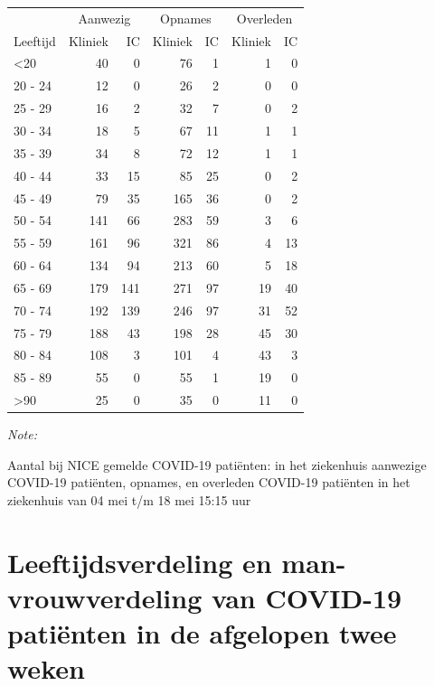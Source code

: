 \documentclass[
  english,
  man,floatsintext]{apa6}
\begin{document}
\begin{table}
\centering\begingroup\fontsize{10}{12}\selectfont

\begin{threeparttable}
\begin{tabular}{lrrrrrr}
\toprule
\multicolumn{1}{c}{ } & \multicolumn{2}{c}{Aanwezig} & \multicolumn{2}{c}{Opnames} & \multicolumn{2}{c}{Overleden} \\
\cmidrule(l{3pt}r{3pt}){2-3} \cmidrule(l{3pt}r{3pt}){4-5} \cmidrule(l{3pt}r{3pt}){6-7}
Leeftijd & Kliniek & IC & Kliniek & IC & Kliniek & IC\\
\midrule
<20 & 40 & 0 & 76 & 1 & 1 & 0\\
20 - 24 & 12 & 0 & 26 & 2 & 0 & 0\\
25 - 29 & 16 & 2 & 32 & 7 & 0 & 2\\
30 - 34 & 18 & 5 & 67 & 11 & 1 & 1\\
35 - 39 & 34 & 8 & 72 & 12 & 1 & 1\\
40 - 44 & 33 & 15 & 85 & 25 & 0 & 2\\
45 - 49 & 79 & 35 & 165 & 36 & 0 & 2\\
50 - 54 & 141 & 66 & 283 & 59 & 3 & 6\\
55 - 59 & 161 & 96 & 321 & 86 & 4 & 13\\
60 - 64 & 134 & 94 & 213 & 60 & 5 & 18\\
65 - 69 & 179 & 141 & 271 & 97 & 19 & 40\\
70 - 74 & 192 & 139 & 246 & 97 & 31 & 52\\
75 - 79 & 188 & 43 & 198 & 28 & 45 & 30\\
80 - 84 & 108 & 3 & 101 & 4 & 43 & 3\\
85 - 89 & 55 & 0 & 55 & 1 & 19 & 0\\
>90 & 25 & 0 & 35 & 0 & 11 & 0\\
\bottomrule
\end{tabular}
\begin{tablenotes}
\item \textit{Note: } 
\item Aantal bij NICE gemelde COVID-19 patiënten: in het ziekenhuis aanwezige COVID-19 patiënten, opnames, en overleden COVID-19 patiënten in het ziekenhuis van 04 mei t/m 18 mei 15:15 uur
\end{tablenotes}
\end{threeparttable}
\endgroup{}
\end{table}

\newpage

\hypertarget{leeftijdsverdeling-en-man-vrouwverdeling-van-covid-19-patiuxebnten-in-de-afgelopen-twee-weken}{%
\section{Leeftijdsverdeling en man-vrouwverdeling van COVID-19 patiënten in de afgelopen twee weken}\label{leeftijdsverdeling-en-man-vrouwverdeling-van-covid-19-patiuxebnten-in-de-afgelopen-twee-weken}}
\end{document}
